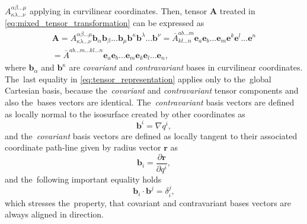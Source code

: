 \documentclass[review]{elsarticle}
\newcommand{\pdv}[2]{\frac{\partial{#1}}{\partial{#2}}}
\newcommand{\vect}[1]{\boldsymbol{#1}}
\newcommand{\matr}[1]{\mathbf{#1}}
\begin{document}
$A^{\alpha\beta...\mu}_{\kappa\lambda...\nu}$ applying in curvilinear 
coordinates. 
Then, tensor $\matr{A}$ treated in \eqref{eq:mixed_tensor_transformation} 
can be expressed as
\begin{multline}
  \matr{A} = A^{\alpha\beta...\mu}_{\kappa\lambda...\nu} 
  \vect{b}_\alpha\vect{b}_\beta...\vect{b}_\mu
  \vect{b}^{\kappa}\vect{b}^{\lambda}...\vect{b}^{\nu}
  = \bar{A}^{ab...m}_{kl...n}\vect{e}_a\vect{e}_b...\vect{e}_m
  \vect{e}^{k}\vect{e}^{l}...\vect{e}^{n}\\ 
  = \bar{A}^{ab...m...kl...n}\vect{e}_a\vect{e}_b...\vect{e}_m
  \vect{e}_{k}\vect{e}_{l}...\vect{e}_{n}, 
  \label{eq:tensor_representation}
\end{multline}
where $\vect{b}_\alpha$ and $\vect{b}^{\kappa}$ are 
\textit{covariant} and \textit{contravariant} bases in curvilinear coordinates. 
The~last equality in \eqref{eq:tensor_representation} applies only to 
the~global Cartesian basis, because the~\textit{covariant} and 
\textit{contravariant} tensor components and also
the~bases vectors are identical. 
The~\textit{contravariant} basis vectors 
are defined as locally normal to the isosurface created by other coordinates as
\begin{equation}
  \vect{b}^i = \nabla q^i ,
  \label{eq:contravariant_bases}
\end{equation}
and the~\textit{covariant} basis vectors are defined as locally tangent to 
their associated coordinate path-line given by radius vector $\vect{r}$ as
\begin{equation}
  \vect{b}_i = \pdv{\vect{r}}{q^i} ,
  \label{eq:covariant_bases}
\end{equation}
and the~following important equality holds
\begin{equation}
  \vect{b}_i\cdot\vect{b}^j = \delta_i^j ,
  \label{eq:basis_vectors_alignement}
\end{equation}
which stresses the~property, that covariant and contravariant bases vectors
are always aligned in direction.
\end{document}
